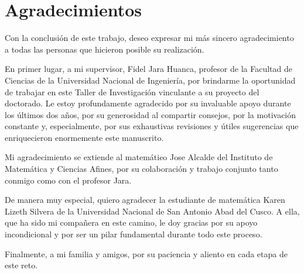 \chapter*{Agradecimientos}

Con la conclusión de este trabajo, deseo expresar mi más sincero
agradecimiento a todas las personas que hicieron posible su
realización.

En primer lugar, a mi supervisor, Fidel Jara Huanca, profesor de la
Facultad de Ciencias de la Universidad Nacional de Ingeniería, por
brindarme la oportunidad de trabajar en este Taller de Investigación
vinculante a su proyecto del doctorado.
Le estoy profundamente agradecido por su invaluable apoyo durante los
últimos dos años, por su generosidad al compartir consejos, por la
motivación constante y, especialmente, por sus exhaustivas revisiones
y útiles sugerencias que enriquecieron enormemente este manuscrito.

Mi agradecimiento se extiende al matemático Jose Alcalde del
Instituto de Matemática y Ciencias Afines, por su colaboración y
trabajo conjunto tanto conmigo como con el profesor Jara.

De manera muy especial, quiero agradecer la estudiante de matemática
Karen Lizeth Silvera de la Universidad Nacional de San Antonio Abad
del Cusco.
A ella, que ha sido mi compañera en este camino, le doy gracias por
su apoyo incondicional y por ser un pilar fundamental durante todo
este proceso.

Finalmente, a mi familia y amigos, por su paciencia y aliento en cada
etapa de este reto.

